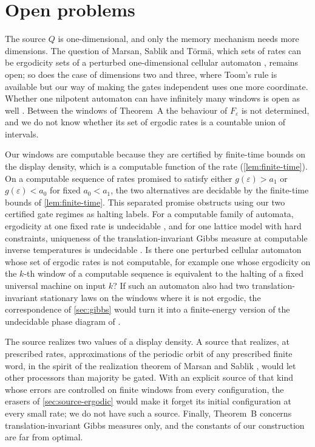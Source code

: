 \documentclass[11pt]{article}
\theoremstyle{plain}
\theoremstyle{definition}
\theoremstyle{remark}
\newcommand{\eps}{\varepsilon}
\begin{document}
\section{Open problems}\label{sec:open}

The source $Q$ is one-dimensional, and only the memory mechanism needs more dimensions. The question of Marsan, Sablik and T\"orm\"a, which sets of rates can be ergodicity sets of a perturbed one-dimensional cellular automaton \cite{MST26}, remains open; so does the case of dimensions two and three, where Toom's rule is available but our way of making the gates independent uses one more coordinate. Whether one nilpotent automaton can have infinitely many windows is open as well \cite{DMnil}. Between the windows of Theorem~A the behaviour of $F_\eps$ is not determined, and we do not know whether its set of ergodic rates is a countable union of intervals.

Our windows are computable because they are certified by finite-time bounds on the display density, which is a computable function of the rate (\cref{lem:finite-time}). On a computable sequence of rates promised to satisfy either $g(\eps)>a_1$ or $g(\eps)<a_0$ for fixed $a_0<a_1$, the two alternatives are decidable by the finite-time bounds of \cref{lem:finite-time}. This separated promise obstructs using our two certified gate regimes as halting labels. For a computable family of automata, ergodicity at one fixed rate is undecidable \cite{DMforget}, and for one lattice model with hard constraints, uniqueness of the translation-invariant Gibbs measure at computable inverse temperatures is undecidable \cite{DMhard}. Is there one perturbed cellular automaton whose set of ergodic rates is not computable, for example one whose ergodicity on the $k$-th window of a computable sequence is equivalent to the halting of a fixed universal machine on input $k$? If such an automaton also had two translation-invariant stationary laws on the windows where it is not ergodic, the correspondence of \cref{sec:gibbs} would turn it into a finite-energy version of the undecidable phase diagram of \cite{DMhard}.

The source realizes two values of a display density. A source that realizes, at prescribed rates, approximations of the periodic orbit of any prescribed finite word, in the spirit of the realization theorem of Marsan and Sablik \cite{MS24}, would let other processors than majority be gated. With an explicit source of that kind whose errors are controlled on finite windows from every configuration, the erasers of \cref{sec:source-ergodic} would make it forget its initial configuration at every small rate; we do not have such a source. Finally, Theorem~B concerns translation-invariant Gibbs measures only, and the constants of our construction are far from optimal.
\end{document}

